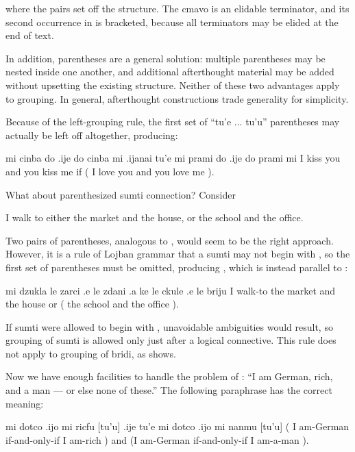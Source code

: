 {\noindent}where the  pairs set off the structure. The
    cmavo  is an elidable terminator, and its second
    occurrence in  is bracketed,
    because all terminators may be elided at the end of text. 

In addition, parentheses are a general solution: multiple
    parentheses may be nested inside one another, and additional
    afterthought material may be added without upsetting the
    existing structure. Neither of these two advantages apply to
     grouping. In general, afterthought constructions trade
    generality for simplicity.

Because of the left-grouping rule, the first set of ``tu'e
    ... tu'u'' parentheses may actually be left off altogether,
    producing:
\begin{example}
mi cinba do .ije do cinba mi\n
\T	.ijanai tu'e mi prami do .ije do prami mi \n
I kiss you and you kiss me\n
\T	if ( I love you and you love me ).
\end{example}

What about parenthesized sumti connection? Consider
\begin{example}
I walk to either the market and the house,\n
\T	or the school and the office.
\end{example}

Two pairs of parentheses, analogous to , would seem to be the right approach. However, it is a
    rule of Lojban grammar that a sumti may not begin with ,
    so the first set of parentheses must be omitted, producing , which is instead parallel to :
\begin{example}
mi dzukla le zarci .e le zdani\n
\T	.a ke le ckule .e le briju \n
I walk-to the market and the house\n
\T	or ( the school and the office ).
\end{example}

If sumti were allowed to begin with , unavoidable
    ambiguities would result, so  grouping of sumti is
    allowed only just after a logical connective. This rule does
    not apply to  grouping of bridi, as  shows. 

Now we have enough facilities to handle the problem of : ``I am German, rich, and a man
    --- or else none of these.'' The following paraphrase has the
    correct meaning:
\begin{example}
\T	{} mi dotco .ijo mi ricfu [tu'u]\n
\T	.ije tu'e mi dotco .ijo mi nanmu [tu'u]\n
( I am-German if-and-only-if I am-rich )\n
\T	and (I am-German if-and-only-if I am-a-man ).
\end{example}


